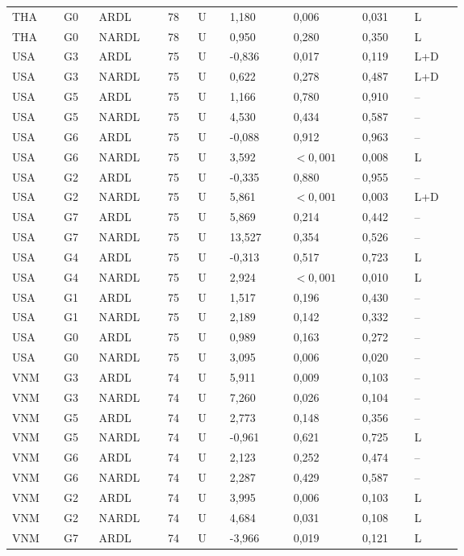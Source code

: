 {\begin{longtable}{p{0.075\linewidth}p{0.05\linewidth}p{0.09\linewidth}p{0.04\linewidth}p{0.05\linewidth}p{0.1\linewidth}p{0.085\linewidth}p{0.085\linewidth}p{0.075\linewidth}}
THA & G0 & ARDL & 78 & U & 1,180 & 0,006 & 0,031 & L\\
THA & G0 & NARDL & 78 & U & 0,950 & 0,280 & 0,350 & L\\
USA & G3 & ARDL & 75 & U & -0,836 & 0,017 & 0,119 & L+D\\
USA & G3 & NARDL & 75 & U & 0,622 & 0,278 & 0,487 & L+D\\
USA & G5 & ARDL & 75 & U & 1,166 & 0,780 & 0,910 & --\\
USA & G5 & NARDL & 75 & U & 4,530 & 0,434 & 0,587 & --\\
USA & G6 & ARDL & 75 & U & -0,088 & 0,912 & 0,963 & --\\
USA & G6 & NARDL & 75 & U & 3,592 & \(<0{,}001\) & 0,008 & L\\
USA & G2 & ARDL & 75 & U & -0,335 & 0,880 & 0,955 & --\\
USA & G2 & NARDL & 75 & U & 5,861 & \(<0{,}001\) & 0,003 & L+D\\
USA & G7 & ARDL & 75 & U & 5,869 & 0,214 & 0,442 & --\\
USA & G7 & NARDL & 75 & U & 13,527 & 0,354 & 0,526 & --\\
USA & G4 & ARDL & 75 & U & -0,313 & 0,517 & 0,723 & L\\
USA & G4 & NARDL & 75 & U & 2,924 & \(<0{,}001\) & 0,010 & L\\
USA & G1 & ARDL & 75 & U & 1,517 & 0,196 & 0,430 & --\\
USA & G1 & NARDL & 75 & U & 2,189 & 0,142 & 0,332 & --\\
USA & G0 & ARDL & 75 & U & 0,989 & 0,163 & 0,272 & --\\
USA & G0 & NARDL & 75 & U & 3,095 & 0,006 & 0,020 & --\\
VNM & G3 & ARDL & 74 & U & 5,911 & 0,009 & 0,103 & --\\
VNM & G3 & NARDL & 74 & U & 7,260 & 0,026 & 0,104 & --\\
VNM & G5 & ARDL & 74 & U & 2,773 & 0,148 & 0,356 & --\\
VNM & G5 & NARDL & 74 & U & -0,961 & 0,621 & 0,725 & L\\
VNM & G6 & ARDL & 74 & U & 2,123 & 0,252 & 0,474 & --\\
VNM & G6 & NARDL & 74 & U & 2,287 & 0,429 & 0,587 & --\\
VNM & G2 & ARDL & 74 & U & 3,995 & 0,006 & 0,103 & L\\
VNM & G2 & NARDL & 74 & U & 4,684 & 0,031 & 0,108 & L\\
VNM & G7 & ARDL & 74 & U & -3,966 & 0,019 & 0,121 & L\\

\end{longtable}}
